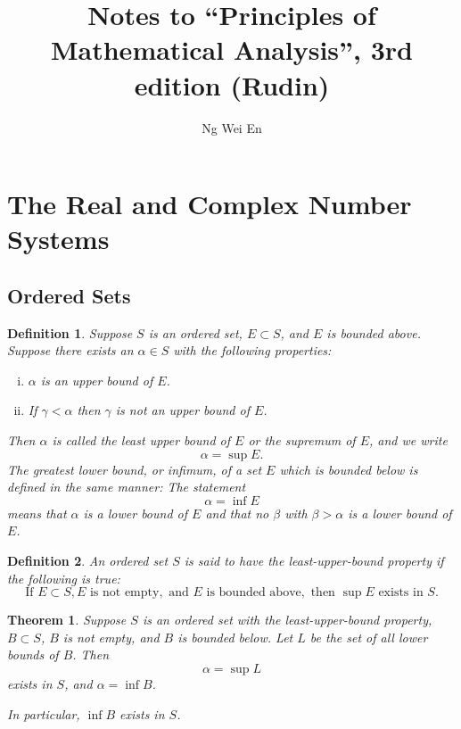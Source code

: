 \documentclass{article}
\title{Notes to ``Principles of Mathematical Analysis'', 3rd edition (Rudin)}
\author{Ng Wei En}
\newtheorem{theorem}{Theorem}
\numberwithin{theorem}{section}
\newtheorem{definition}{Definition}
\numberwithin{definition}{section}
\begin{document}
\maketitle
\tableofcontents
\newpage

\section{The Real and Complex Number Systems}

\subsection*{Ordered Sets}

\setcounter{definition}{7}
\begin{definition}
  Suppose $S$ is an ordered set, $E \subset S$, and $E$ is bounded above.
  Suppose there exists an $\alpha \in S$ with the following properties:
  \begin{enumerate}[(i)]
    \item $\alpha$ is an upper bound of $E$.
    \item If $\gamma < \alpha$ then $\gamma$ is not an upper bound of $E$.
  \end{enumerate}
  Then $\alpha$ is called the \emph{least upper bound} of $E$ or the
  \emph{supremum} of $E$, and we write \[
    \alpha = \sup E.
  \]
  The \emph{greatest lower bound}, or \emph{infimum}, of a set $E$ which is
  bounded below is defined in the same manner: The statement \[
    \alpha = \inf E
  \] means that $\alpha$ is a lower bound of $E$ and that no $\beta$ with $\beta
  > \alpha$ is a lower bound of $E$.
\end{definition}

\setcounter{definition}{9}
\begin{definition}
  An ordered set $S$ is said to have the \emph{least-upper-bound property} if
  the following is true:
  \[
    \text{If } E \subset S, E \text{ is not empty}, \text{ and } E \text{ is
    bounded above}, \text{ then } \sup E \text{ exists in } S.
  \]
\end{definition}

\setcounter{theorem}{10}
\begin{theorem}
  Suppose $S$ is an ordered set with the least-upper-bound property, $B \subset
  S$, $B$ is not empty, and $B$ is bounded below. Let $L$ be the set of all
  lower bounds of $B$. Then \[
    \alpha = \sup L
  \] exists in $S$, and $\alpha = \inf B$.

  In particular, $\inf B$ exists in $S$.
\end{theorem}
\end{document}
